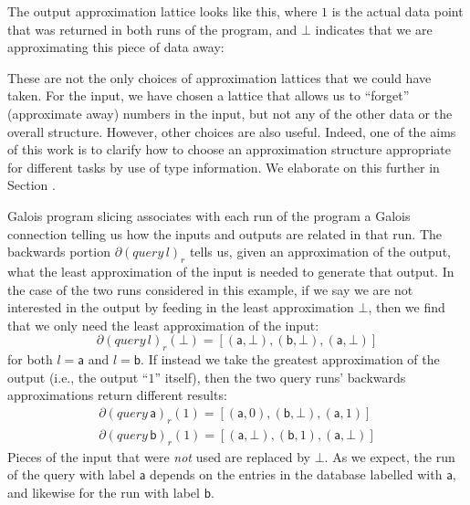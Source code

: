 \begin{example}
\begin{center}
  \end{center}
  The output approximation lattice looks like this, where $1$ is the actual data point that was returned in both runs of the program, and $\bot$ indicates that we are approximating this piece of data away:
  \begin{center}
  \end{center}
  These are not the only choices of approximation lattices that we could have taken. For the input, we have chosen a lattice that allows us to ``forget'' (approximate away) numbers in the input, but not any of the other data or the overall structure. However, other choices are also useful. Indeed, one of the aims of this work is to clarify how to choose an approximation structure appropriate for different tasks by use of type information. We elaborate on this further in Section .

  Galois program slicing associates with each run of the program a Galois connection telling us how the inputs and outputs are related in that run. The backwards portion $\partial (\mathit{query}\,l)_r$ tells us, given an approximation of the output, what the least approximation of the input is needed to generate that output. In the case of the two runs considered in this example, if we say we are not interested in the output by feeding in the least approximation $\bot$, then we find that we only need the least approximation of the input:
  \begin{displaymath}
    \partial (\mathit{query}\,l)_r(\bot) = [(\mathsf{a},\bot), (\mathsf{b}, \bot), (\mathsf{a}, \bot)]
  \end{displaymath}
  for both $l = \mathsf{a}$ and $l = \mathsf{b}$. If instead we take the greatest approximation of the output (i.e., the output ``$1$'' itself), then the two query runs' backwards approximations return different results:
  \begin{displaymath}
    \begin{array}{l}
      \partial (\mathit{query}\,\mathsf{a})_r(1) = [(\mathsf{a},0), (\mathsf{b},\bot), (\mathsf{a},1)] \\
      \partial (\mathit{query}\,\mathsf{b})_r(1) = [(\mathsf{a},\bot), (\mathsf{b},1), (\mathsf{a},\bot)]
    \end{array}
  \end{displaymath}
  Pieces of the input that were {\em not} used are replaced by $\bot$. As we expect, the run of the query with label $\mathsf{a}$ depends on the entries in the database labelled with $\mathsf{a}$, and likewise for the run with label $\mathsf{b}$.


\end{example}
